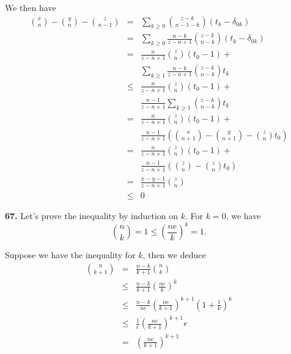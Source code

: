 \documentclass[a4paper,12pt]{article}
\newcommand{\newpar}[1]{\bigskip \noindent \textbf{#1.}}
\begin{document}
We then have
\begin{eqnarray*}
  {x \choose n} - {y \choose n} - {z \choose n-1} &=& \sum_{k\ge 0}
  {z-k \choose n-1-k}(t_k-\delta_{0k}) \\
  &=& \sum_{k\ge0} \frac{n-k}{z-n+1} {z-k \choose n-k}
  (t_k-\delta_{0k}) \\
  &=& \frac{n}{z-n+1}{z \choose n}(t_0 - 1) + \\
  && \sum_{k \ge 1} \frac{n-k}{z-n+1}{z-k \choose n-k}t_k \\
  &\le& \frac{n}{z-n+1}{z \choose n}(t_0 - 1) + \\
  && \frac{n-1}{z-n+1}\sum_{k\ge 1} {z-k \choose n-k}t_k \\
  &=& \frac{n}{z-n+1}{z \choose n}(t_0 - 1) + \\
  && \frac{n-1}{z-n+1} \left( {x \choose n+1} - {y\choose n+1} - {z
    \choose n}t_0\right) \\
  &=& \frac{n}{z-n+1}{z \choose n}(t_0 - 1) + \\
  && \frac{n-1}{z-n+1} \left( {z \choose n} - {z \choose n}t_0\right) \\
  &=& \frac{x-y-1}{z-n+1} {z \choose n} \\
  &\le& 0
\end{eqnarray*}

\newpar{67} Let's prove the inequality by induction on $k$.  For
$k=0$, we have
\[ {n \choose k} = 1 \le \left( \frac{ne}{k} \right)^k = 1.\]

Suppose we have the inequality for $k$, then we deduce
\begin{eqnarray*}
  {n \choose k+1} &=& \frac{n-k}{k+1}{n \choose k} \\
  &\le& \frac{n-k}{k+1} \left(\frac{ne}{k}\right)^k \\
  &\le& \frac{n-k}{ne} \left(\frac{ne}{k+1}\right)^{k+1}
  \left(1+\frac{1}{k}\right)^k \\
  &\le& \frac{1}{e} \left( \frac{ne}{k+1} \right)^{k+1} e \\
  &=& \left(\frac{ne}{k+1}\right)^{k+1}
\end{eqnarray*}
\end{document}
